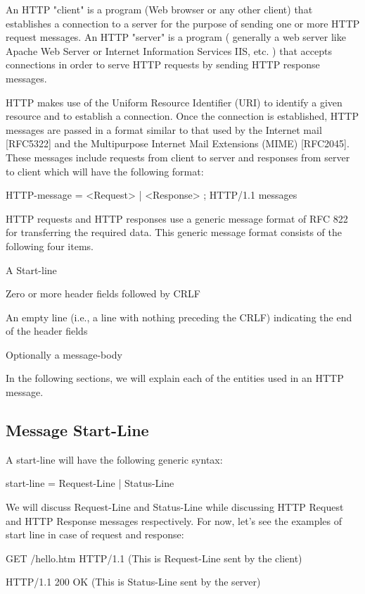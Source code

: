 \documentclass[a4paper,11pt,bahasa]{extarticle}
\begin{document}
An HTTP "client" is a program (Web browser or any other client) that establishes a connection to a 
server for the purpose of sending one or more HTTP request messages. An HTTP "server" is a program ( 
generally a web server like Apache Web Server or Internet Information Services IIS, etc. ) that accepts 
connections in order to serve HTTP requests by sending HTTP response messages.

HTTP makes use of the Uniform Resource Identifier (URI) to identify a given resource and to establish a 
connection. Once the connection is established, HTTP messages are passed in a format similar to that 
used by the Internet mail [RFC5322] and the Multipurpose Internet Mail Extensions (MIME) [RFC2045]. 
These messages include requests from client to server and responses from server to client which will 
have the following format:
\begin{textcode}
HTTP-message   = <Request> | <Response> ; HTTP/1.1 messages
\end{textcode}

HTTP requests and HTTP responses use a generic message format of RFC 822 for transferring the required 
data. This generic message format consists of the following four items.
\begin{textcode}
    A Start-line

    Zero or more header fields followed by CRLF

    An empty line (i.e., a line with nothing preceding the CRLF) 
    indicating the end of the header fields

    Optionally a message-body
\end{textcode}

In the following sections, we will explain each of the entities used in an HTTP message.

\subsection{Message Start-Line}

A start-line will have the following generic syntax:
\begin{textcode}
start-line = Request-Line | Status-Line
\end{textcode}

We will discuss Request-Line and Status-Line while discussing HTTP Request and HTTP Response messages 
respectively. For now, let's see the examples of start line in case of request and response:
\begin{textcode}
GET /hello.htm HTTP/1.1     (This is Request-Line sent by the client)

HTTP/1.1 200 OK             (This is Status-Line sent by the server)
\end{textcode}
\end{document}

